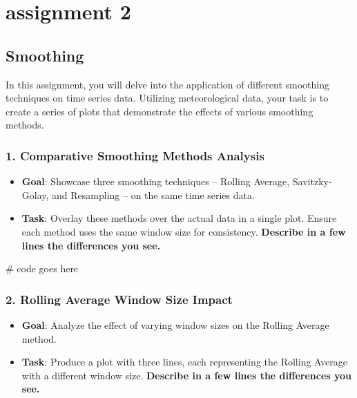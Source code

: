 \documentclass[
  letterpaper,
  DIV=11,
  numbers=noendperiod,
  oneside]{scrreprt}
\newenvironment{Shaded}{\begin{snugshade}}{\end{snugshade}}
\newcommand{\CommentTok}[1]{\textcolor[rgb]{0.37,0.37,0.37}{#1}}
\providecommand{\tightlist}{%
  \setlength{\itemsep}{0pt}\setlength{\parskip}{0pt}}\usepackage{longtable,booktabs,array}
\begin{document}
\hypertarget{assignment-2}{%
\chapter{assignment 2}\label{assignment-2}}

\hypertarget{smoothing-1}{%
\section{Smoothing}\label{smoothing-1}}

In this assignment, you will delve into the application of different
smoothing techniques on time series data. Utilizing meteorological data,
your task is to create a series of plots that demonstrate the effects of
various smoothing methods.

\hypertarget{comparative-smoothing-methods-analysis}{%
\subsection{1. Comparative Smoothing Methods
Analysis}\label{comparative-smoothing-methods-analysis}}

\begin{itemize}
\tightlist
\item
  \textbf{Goal}: Showcase three smoothing techniques -- Rolling Average,
  Savitzky-Golay, and Resampling -- on the same time series data.
\item
  \textbf{Task}: Overlay these methods over the actual data in a single
  plot. Ensure each method uses the same window size for consistency.
  \textbf{Describe in a few lines the differences you see.}
\end{itemize}

\begin{Shaded}
\begin{Highlighting}[]
\CommentTok{\# code goes here}
\end{Highlighting}
\end{Shaded}

\hypertarget{rolling-average-window-size-impact}{%
\subsection{2. Rolling Average Window Size
Impact}\label{rolling-average-window-size-impact}}

\begin{itemize}
\tightlist
\item
  \textbf{Goal}: Analyze the effect of varying window sizes on the
  Rolling Average method.
\item
  \textbf{Task}: Produce a plot with three lines, each representing the
  Rolling Average with a different window size. \textbf{Describe in a
  few lines the differences you see.}
\end{itemize}
\end{document}
